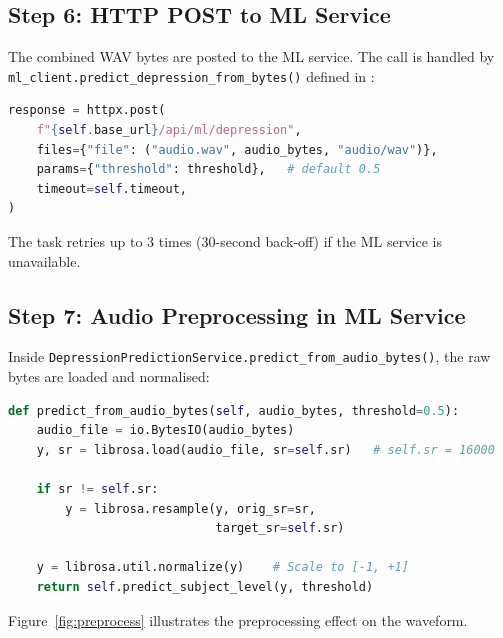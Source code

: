 \subsection{Step 6: HTTP POST to ML Service}

The combined WAV bytes are posted to the ML service. The call is handled by \texttt{ml\_client.\allowbreak predict\_depression\_from\_bytes()} defined in :

\begin{lstlisting}[language=Python, caption={HTTP POST to ML service.}]
response = httpx.post(
    f"{self.base_url}/api/ml/depression",
    files={"file": ("audio.wav", audio_bytes, "audio/wav")},
    params={"threshold": threshold},   # default 0.5
    timeout=self.timeout,
)
\end{lstlisting}

The task retries up to 3 times (30-second back-off) if the ML service is unavailable.

\subsection{Step 7: Audio Preprocessing in ML Service}

Inside \texttt{Depres\-sion\-Pre\-dic\-tion\-Ser\-vice.\allowbreak predict\_from\_audio\_bytes()}, the raw bytes are loaded and normalised:

\begin{lstlisting}[language=Python, caption={Preprocessing in ml-service (depression\_prediction.py).}]
def predict_from_audio_bytes(self, audio_bytes, threshold=0.5):
    audio_file = io.BytesIO(audio_bytes)
    y, sr = librosa.load(audio_file, sr=self.sr)   # self.sr = 16000

    if sr != self.sr:
        y = librosa.resample(y, orig_sr=sr,
                             target_sr=self.sr)

    y = librosa.util.normalize(y)    # Scale to [-1, +1]
    return self.predict_subject_level(y, threshold)
\end{lstlisting}

Figure~\ref{fig:preprocess} illustrates the preprocessing effect on the waveform.


